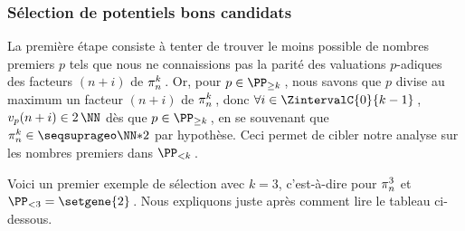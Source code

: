 \subsubsection{Sélection de potentiels bons candidats} \label{algos-used-select}

\leavevmode
\smallskip

La première étape consiste à tenter de trouver le moins possible de nombres premiers $p$ tels que nous ne connaissions pas la parité des valuations $p$-adiques des facteurs $(n+i)$ de $\consprod$\,. 
Or, pour $p \in \PP_{\geq k}$\,, nous savons que $p$ divise au maximum un facteur $(n+i)$ de $\consprod$\,, donc $\forall i \in \ZintervalC{0}{k-1}$\,, $\padicval{n+i} \in 2\,\NN$ dès que $p \in \PP_{\geq k}$\,, en se souvenant que $\consprod \in \NNssquare$ par hypothèse.
Ceci permet de cibler notre analyse sur les nombres premiers dans $\PP_{< k}$\,. 




\medskip

Voici un premier exemple de sélection avec $k = 3$, c'est-à-dire pour $\consprod<3>$ et $\PP_{< 3} = \setgene{2}$\,. Nous expliquons juste après comment lire le tableau ci-dessous.


\begin{center}
\end{center}

